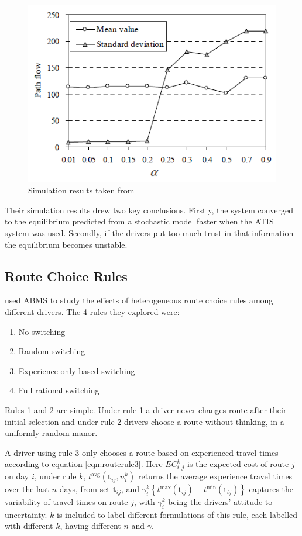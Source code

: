 \documentclass[12pt, a4paper, onecolumn]{article}
\begin{document}
\begin{figure}[h]
	\centering
	\includegraphics[scale=1]{atis_fig.png}
	\caption{Simulation results taken from \cite{Liu2007}}
	\label{fig:atisafig}
	\end{figure}

Their simulation results drew two key conclusions. Firstly, the system converged to the equilibrium predicted from a stochastic model faster when the ATIS system was used. Secondly, if the drivers put too much trust in that information the equilibrium becomes unstable.

\subsection{Route Choice Rules}
\cite{Nakayama2001} used ABMS to study the effects of heterogeneous route choice rules among different drivers. The 4 rules they explored were:

\begin{enumerate}
	\item{No switching}
	\item{Random switching}
	\item{Experience-only based switching}
	\item{Full rational switching}
	\end{enumerate}

Rules 1 and 2 are simple. Under rule 1 a driver never changes route after their initial selection and under rule 2 drivers choose a route without thinking, in a uniformly random manor. 

A driver using rule 3 only chooses a route based on experienced travel times according to equation \ref{eqn:routerule3}. Here $EC_{i,j}^{k}$ is the expected cost of route $j$ on day $i$, under rule $k$, $t^{\mathrm{avg}}\left(\mathbf{t}_{i j}, n_{i}^{k}\right)$ returns the average experience travel times over the last $n$ days, from set $\mathbf{t}_{i j}$, and $\gamma_{i}^{k}\left\{t^{\max }\left(\mathrm{t}_{i j}\right)-t^{\min }\left(\mathrm{t}_{i j}\right)\right\}$ captures the variability of travel times on route $j$, with $\gamma_{i}^{k}$ being the drivers' attitude to uncertainty. $k$ is included to label different formulations of this rule, each labelled with different $k$, having different $n$ and $\gamma$.
\end{document}
